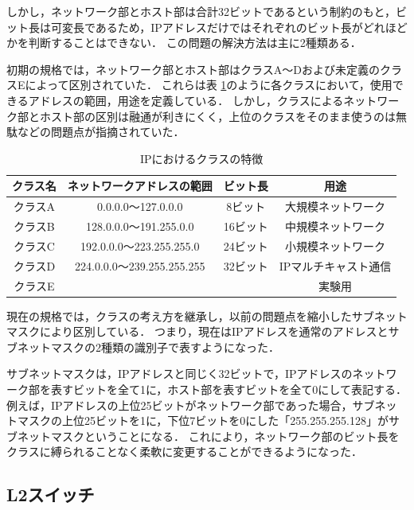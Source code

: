 しかし，ネットワーク部とホスト部は合計32ビットであるという制約のもと，ビット長は可変長であるため，IPアドレスだけではそれぞれのビット長がどれほどかを判断することはできない．
この問題の解決方法は主に2種類ある．

初期の規格では，ネットワーク部とホスト部はクラスA～Dおよび未定義のクラスEによって区別されていた．
これらは表 \ref{tab:2-3}のように各クラスにおいて，使用できるアドレスの範囲，用途を定義している．
しかし，クラスによるネットワーク部とホスト部の区別は融通が利きにくく，上位のクラスをそのまま使うのは無駄などの問題点が指摘されていた．

\begin{table}[tb]
	\begin{center}
		\caption{IPにおけるクラスの特徴}
		\begin{tabular}{c|c|c|c}
			\hline
			クラス名 & ネットワークアドレスの範囲 & ビット長 & 用途　\\ \hline \hline
			クラスA & 0.0.0.0～127.0.0.0 & 8ビット & 大規模ネットワーク\\ \hline
			クラスB & 128.0.0.0～191.255.0.0 & 16ビット & 中規模ネットワーク \\ \hline
			クラスC & 192.0.0.0～223.255.255.0 & 24ビット & 小規模ネットワーク \\ \hline
			クラスD & 224.0.0.0～239.255.255.255 & 32ビット & IPマルチキャスト通信\\ \hline
			クラスE & & & 実験用　\\ \hline
		\end{tabular}
		\label{tab:2-3}
	\end{center}
\end{table}

現在の規格では，クラスの考え方を継承し，以前の問題点を縮小したサブネットマスクにより区別している．
つまり，現在はIPアドレスを通常のアドレスとサブネットマスクの2種類の識別子で表すようになった．

サブネットマスクは，IPアドレスと同じく32ビットで，IPアドレスのネットワーク部を表すビットを全て1に，ホスト部を表すビットを全て0にして表記する．
例えば，IPアドレスの上位25ビットがネットワーク部であった場合，サブネットマスクの上位25ビットを1に，下位7ビットを0にした「255.255.255.128」がサブネットマスクということになる．
これにより，ネットワーク部のビット長をクラスに縛られることなく柔軟に変更することができるようになった．

\subsection{L2スイッチ}

